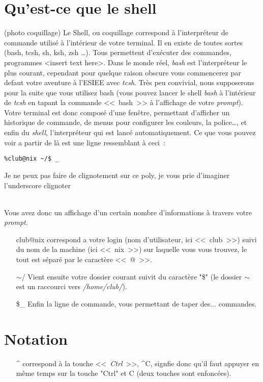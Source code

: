 \documentclass[french, a4paper, 12pt, titlepage]{article}
\begin{document}
\section{Qu'est-ce que le shell}
(photo coquillage)
Le Shell, ou coquillage correspond à l'interpréteur de commande utilisé à l'intérieur de votre terminal.
Il en existe de toutes sortes (bash, tcsh, sh, ksh, zsh \dots). Tous permettent d'exécuter des commandes, programmes <insert text here>.
Dans le monde réel, \emph{bash} est l'interpréteur le plus courant, cependant pour quelque raison obscure vous commencerez par defaut votre aventure à l'ESIEE avec \emph{tcsh}.
Très peu convivial, nous supposerons pour la suite que vous utilisez bash (vous pouvez lancer le shell \emph{bash} à l'intérieur de \emph{tcsh} en tapant la commande <<~bash~>> à l'affichage de votre \emph{prompt}).
Votre terminal est donc composé d'une fenêtre, permettant d'afficher un historique de commande, de menus pour configurer les couleurs, la police\dots, et enfin du \emph{shell}, l'interpréteur qui est lancé automatiquement.
Ce que vous pouvez voir a partir de là est une ligne ressemblant à ceci~:
\begin{lstlisting}
%club@nix ~/$ _
\end{lstlisting}
\begin{tiny}
Je ne peux pas faire de clignotement sur ce poly, je vous prie d'imaginer l'underscore clignoter
\end{tiny}\\
Vous avez donc un affichage d'un certain nombre d'informations à travers votre \emph{prompt}.

\begin{enumerate}
\item[club@nix] correspond a votre login (nom d'utilisateur, ici <<~club~>>) suivi du nom de la machine (ici <<~nix~>>) sur laquelle vous vous trouvez, le tout est séparé par le caractère <<~@~>>.
\item[$\sim$/] Vient ensuite votre dossier courant suivit du caractère "\$" (le dossier $\sim$ est un raccourci vers \emph{/home/club/}).
\item[\$\_] Enfin la ligne de commande, vous permettant de taper des... commandes.
\end{enumerate}

\section{Notation}
\begin{enumerate}
\item[\^{}] correspond à la touche <<~\emph{Ctrl}~>>, \^{}C, signfie donc qu'il faut appuyer en même temps sur la touche "Ctrl" et C (deux touches sont enfoncées).
\end{enumerate}
\end{document}
